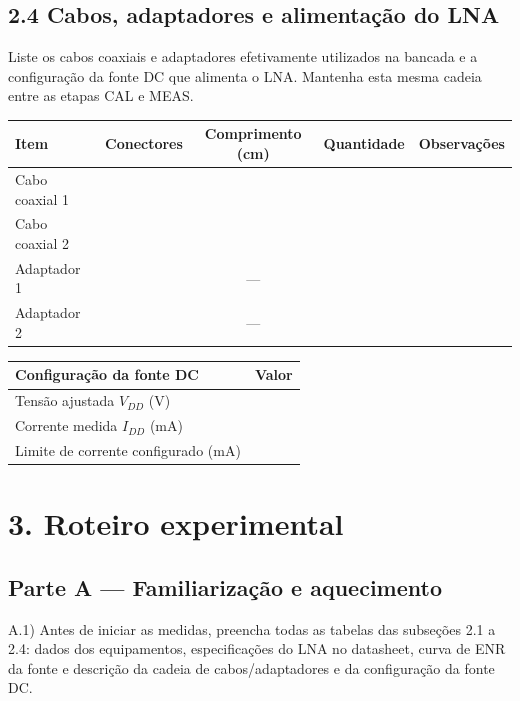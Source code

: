 \documentclass[11pt,a4paper]{article}
\begin{document}
\subsection*{2.4 Cabos, adaptadores e alimentação do LNA}

Liste os cabos coaxiais e adaptadores efetivamente utilizados na bancada e a configuração da fonte DC que alimenta o LNA. Mantenha esta mesma cadeia entre as etapas CAL e MEAS.

{\renewcommand{\arraystretch}{1.5}
\begin{center}
\begin{tabular}{|l|p{3.0cm}|c|c|p{3.0cm}|}
\hline
\textbf{Item} & \textbf{Conectores} & \textbf{Comprimento (cm)} & \textbf{Quantidade} & \textbf{Observações} \\
\hline
Cabo coaxial 1 & & & & \\
\hline
Cabo coaxial 2 & & & & \\
\hline
Adaptador 1 & & --- & & \\
\hline
Adaptador 2 & & --- & & \\
\hline
\end{tabular}

\vspace{0.4em}

\begin{tabular}{|l|c|}
\hline
\textbf{Configuração da fonte DC} & \textbf{Valor} \\
\hline
Tensão ajustada $V_{DD}$ (V)                 & \\
\hline
Corrente medida $I_{DD}$ (mA)                & \\
\hline
Limite de corrente configurado (mA)          & \\
\hline
\end{tabular}
\end{center}
}

\section*{3. Roteiro experimental}

\subsection*{Parte A --- Familiarização e aquecimento}

A.1) Antes de iniciar as medidas, preencha todas as tabelas das subseções 2.1 a 2.4: dados dos equipamentos, especificações do LNA no datasheet, curva de ENR da fonte e descrição da cadeia de cabos/adaptadores e da configuração da fonte DC.
\end{document}
